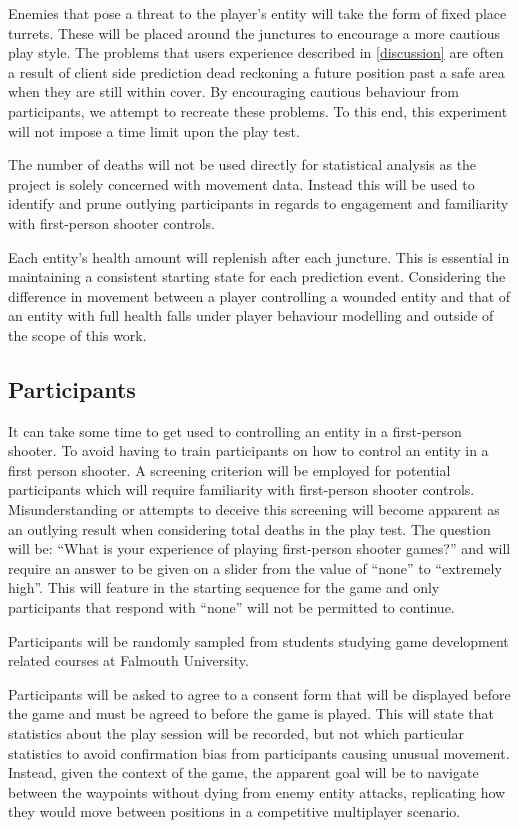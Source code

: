 \documentclass[journal]{IEEEtran}
\begin{document}
Enemies that pose a threat to the player's entity will take the form of fixed place turrets. These will be placed around the junctures to encourage a more cautious play style. The problems that users experience described in \ref{discussion} are often a result of client side prediction dead reckoning a future position past a safe area when they are still within cover. By encouraging cautious behaviour from participants, we attempt to recreate these problems. To this end, this experiment will not impose a time limit upon the play test.

The number of deaths will not be used directly for statistical analysis as the project is solely concerned with movement data. Instead this will be used to identify and prune outlying participants in regards to engagement and familiarity with first-person shooter controls.

Each entity's health amount will replenish after each juncture. This is essential in maintaining a consistent starting state for each prediction event. Considering the difference in movement between a player controlling a wounded entity and that of an entity with full health falls under player behaviour modelling and outside of the scope of this work.
	
\subsection{Participants}

It can take some time to get used to controlling an entity in a first-person shooter. To avoid having to train participants on how to control an entity in a first person shooter. A screening criterion will be employed for potential participants which will require familiarity with first-person shooter controls. Misunderstanding or attempts to deceive this screening will become apparent as an outlying result when considering total deaths in the play test. The question will be: ``What is your experience of playing first-person shooter games?'' and will require an answer to be given on a slider from the value of ``none'' to ``extremely high''. This will feature in the starting sequence for the game and only participants that respond with ``none'' will not be permitted to continue.

Participants will be randomly sampled from students studying game development related courses at Falmouth University.

Participants will be asked to agree to a consent form that will be displayed before the game and must be agreed to before the game is played. This will state that statistics about the play session will be recorded, but not which particular statistics to avoid confirmation bias from participants causing unusual movement. Instead, given the context of the game, the apparent goal will be to navigate between the waypoints without dying from enemy entity attacks, replicating how they would move between positions in a competitive multiplayer scenario.
\end{document}
